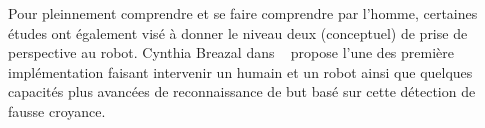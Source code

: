 \documentclass[a4paper,11pt,twoside]{StyleThese}
\begin{document}
Pour pleinnement comprendre et se faire comprendre par l'homme, certaines études ont également visé à donner le niveau deux (conceptuel) de prise de perspective au robot. Cynthia Breazal dans ~\cite{BreazealGB09} propose l'une des première implémentation faisant intervenir un humain et un robot ainsi que quelques capacités plus avancées de reconnaissance de but basé sur cette détection de fausse croyance.





\end{document}
